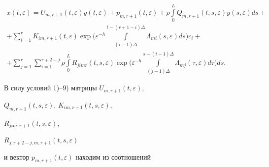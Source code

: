 \begin{multline} 


x(t,\varepsilon)=U_{m,r+1}(t,\varepsilon) 


y(t,\varepsilon)+p_{m,r+1}(t,\varepsilon)+\rho 


\int\limits^L_0 Q_{m,r+1}(t,s,\varepsilon)y(s,\varepsilon)ds+ \\ 


% 


+\sum^r_{i=1}K_{im,r+1}(t,\varepsilon)\exp\bigg( 


\varepsilon^{-h}\int\limits^{t-(r+1-i)\Delta}_{(i-1)\Delta} 


\Lambda_{mi}(s,\varepsilon)ds\bigg)c_i+ \\ 


% 


+\sum^r_{j=1}\sum^{r+2-j}_{i=1}\rho\int\limits^L_0 


R_{jimr}(t,s,\varepsilon)\exp\bigg(\varepsilon^{-h} 


\int\limits^{s-(i-1)\Delta}_{(j-1)\Delta} 


\Lambda_{mj}(\tau,\varepsilon)d\tau\bigg)ds. 


\end{multline} 


 


В силу условий 1)--9) матрицы $U_{m,r+1}(t,\varepsilon)$, 


$Q_{m,r+1}(t,s,\varepsilon)$, $K_{im,r+1}(t,s,\varepsilon)$, 


$R_{jim,r+1}(t,s,\varepsilon)$,\linebreak


$R_{j,r+2-j,m,r+1}(t,s,\varepsilon)$ 


и вектор $p_{m,r+1}(t,\varepsilon)$ находим из соотношений 


